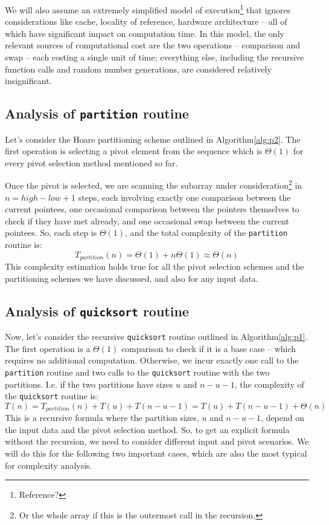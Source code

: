 \documentclass[]{finalproject}
\begin{document}
We will also assume an extremely simplified model of execution\footnote{Reference?} that ignores considerations like cache, locality of reference, hardware architecture -- all of which have significant impact on computation time. In this model, the only relevant sources of computational cost are the two operations -- comparison and swap -- each costing a single unit of time; everything else, including the recursive function calls and random number generations, are considered relatively insignificant.

\subsection{Analysis of \texttt{partition} routine}

Let's consider the Hoare partitioning scheme outlined in Algorithm\ref{alg:p2}. The first operation is selecting a pivot element from the sequence which is $\Theta(1)$ for every pivot selection method mentioned so far.

Once the pivot is selected, we  are scanning the subarray under consideration\footnote{Or the whole array if this is the outermost call in the recursion.} in $n = high - low + 1$ steps, each involving exactly one comparison between the current pointees, one occasional comparison between the pointers themselves to check if they have met already, and one occasional swap between the current pointees. So, each step is $\Theta(1)$, and the total complexity of the \texttt{partition} routine is: $$T_{partition}(n) = \Theta(1) + n\Theta(1) \approx \Theta(n)$$
This complexity estimation holds true for all the pivot selection schemes and the partitioning schemes we have discussed, and also for any input data.

\subsection{Analysis of \texttt{quicksort} routine}

Now, let's consider the recursive \texttt{quicksort} routine outlined in Algorithm\ref{alg:p1}. The first operation is a $\Theta(1)$ comparison to check if it is a base case -- which requires no additional computation. Otherwise, we incur exactly one call to the \texttt{partition} routine and two calls to the \texttt{quicksort} routine with the two partitions. I.e. if the two partitions have sizes $u$ and $n-u-1$, the complexity of the \texttt{quicksort} routine is: $$T(n) = T_{partition}(n) + T(u) + T(n-u-1) = T(u) + T(n-u-1) + \Theta(n)$$
This is a recursive formula where the partition sizes, $u$ and $n-u-1$, depend on the input data and the pivot selection method. So, to get an explicit formula without the recursion, we need to consider different input and pivot scenarios. We will do this for the following two important cases, which are also the most typical for complexity analysis.
\end{document}
